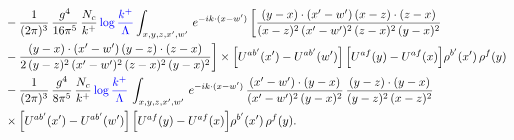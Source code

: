 \documentclass[9pt]{article}
\numberwithin{equation}{section}
\begin{document}
\begin{align}
&-\frac{1}{(2\pi)^{3}}\,\frac{g^{4}}{16\pi^{5}}\,\frac{N_{c}}{k^{+}}\,{\color{blue}\log\frac{k^{+}}{\Lambda}}\int_{x,y,z,x',w'}\,e^{-ik\cdot(x-w')}\,\bigg[\frac{(y-x)\cdot (x'-w')\,(x-z)\cdot (z-x)}{(x-z)^{2}\,(x'-w')^{2}\,(z-x)^{2}\,(y-x)^{2}}\notag \\ & -\frac{(y-x)\cdot (x'-w')\,(y-z)\cdot (z-x)}{2\,(y-z)^{2}\,(x'-w')^{2}\,(z-x)^{2}\,(y-x)^{2}}\bigg]\times\Big[U^{ab'}(x')-U^{ab'}(w')\Big]\,\Big[U^{af}(y)-U^{af}(x)\Big]\rho^{b'}(x')\,\rho^{f}(y)\notag\\
&-\frac{1}{(2\pi)^{3}}\,\frac{g^{4}}{8\pi^{5}}\,\frac{N_{c}}{k^{+}}\,{\color{blue}\log\frac{k^{+}}{\Lambda}}\,\int_{x,y,z,x',w'}\,e^{-ik\cdot(x-w')}\,\frac{(x'-w')\cdot(y-x)}{(x'-w')^{2}\,(y-x)^{2}}\,\frac{(y-z)\cdot(y-x)}{(y-z)^{2}\,(x-z)^{2}}\notag\\
&\times\Big[U^{ab'}(x')-U^{ab'}(w')\Big]\,\Big[U^{af}(y)-U^{af}(x)\Big]\rho^{b'}(x')\,\rho^{f}(y).
\end{align} 
\end{document}
